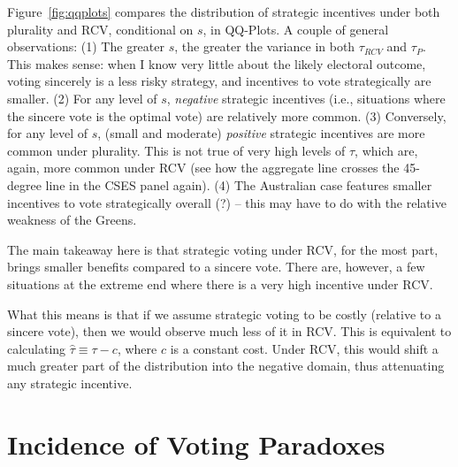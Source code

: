 \documentclass[11pt, letter, margin = 2 in]{article}
\begin{document}
Figure~\ref{fig:qqplots} compares the distribution of strategic incentives under both plurality and RCV, conditional on $s$, in QQ-Plots. A couple of general observations: (1) The greater $s$, the greater the variance in both $\tau_{RCV}$ and  $\tau_{P}$. This makes sense: when I know very little about the likely electoral outcome, voting sincerely is a less risky strategy, and incentives to vote strategically are smaller. (2) For any level of $s$, \textit{negative} strategic incentives (i.e., situations where the sincere vote is the optimal vote) are relatively more common. (3) Conversely, for any level of $s$, (small and moderate) \textit{positive} strategic incentives are more common under plurality. This is not true of very high levels of $\tau$, which are, again, more common under RCV (see how the aggregate line crosses the 45-degree line in the CSES panel again). (4) The Australian case features smaller incentives to vote strategically overall (?) -- this may have to do with the relative weakness of the Greens. 

The main takeaway here is that strategic voting under RCV, for the most part, brings smaller benefits compared to a sincere vote. There are, however, a few situations at the extreme end where there is a very high incentive under RCV.

What this means is that if we assume strategic voting to be costly (relative to a sincere vote), then we would observe much less of it in RCV. This is equivalent to calculating $\hat{\tau} \equiv \tau - c$, where $c$ is a constant cost. Under RCV, this would shift a much greater part of the distribution into the negative domain, thus attenuating any strategic incentive.

\section{Incidence of Voting Paradoxes}
\end{document}
